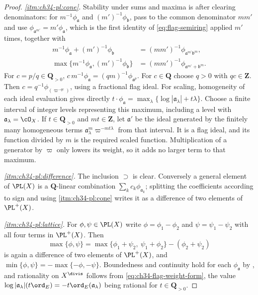\begin{proof}
\emph{\cref{itm:ch34-pl:cone}.}  Stability under sums and maxima is
 after clearing denominators: for
$m^{-1}\phi_{\mathfrak a}$ and $(m')^{-1}\phi_{\mathfrak b}$, pass to
the common denominator $mm'$ and use
$\phi_{\mathfrak a^{m'}}=m'\phi_{\mathfrak a}$, which is the first
identity of \eqref{eq:flag-semiring} applied $m'$ times, together with
\[
 \begin{aligned}
  m^{-1}\phi_{\mathfrak a}+(m')^{-1}\phi_{\mathfrak b}
   &=(mm')^{-1}\phi_{\mathfrak a^{m'}\mathfrak b^{m}},\\
  \max\{m^{-1}\phi_{\mathfrak a},(m')^{-1}\phi_{\mathfrak b}\}
   &=(mm')^{-1}\phi_{\mathfrak a^{m'}+\mathfrak b^{m}}.
 \end{aligned}
\]
For $c=p/q\in\mathbf Q_{>0}$, $c\,m^{-1}\phi_{\mathfrak a}
=(qm)^{-1}\phi_{\mathfrak a^{p}}$.  For $c\in\mathbf Q$ choose $q>0$ with $qc\in\mathbf Z$.
Then $c=q^{-1}\phi_{(\varpi^{-qc})}$, using a fractional flag ideal.
For scaling, homogeneity of each ideal evaluation gives directly
$t\cdot\phi_{\mathfrak a}
=\max_\lambda\{\log|\mathfrak a_\lambda|+t\lambda\}$.
Choose a finite interval of integer levels representing this maximum,
including a level with $\mathfrak a_\lambda=\cO_X$.
If $t\in\mathbf Q_{>0}$ and $mt\in\mathbf Z$, let $\mathfrak a'$
be the ideal generated by the finitely many homogeneous terms
$\mathfrak a_\lambda^m\varpi^{-mt\lambda}$ from that interval.
It is a flag ideal, and its function divided by $m$ is the required
scaled function.  Multiplication of a generator by $\varpi$ only
lowers its weight, so it adds no larger term to that maximum.

\emph{\cref{itm:ch34-pl:difference}.}  The inclusion $\supset$ is clear.
Conversely a general element of $\PL(X)$ is a $\mathbf Q$-linear
combination $\sum_kc_k\phi_{\mathfrak a_k}$; splitting the coefficients
according to sign and using \cref{itm:ch34-pl:cone} writes it as a
difference of two elements of $\PL^+(X)$.

\emph{\cref{itm:ch34-pl:lattice}.}  For $\phi,\psi\in\PL(X)$ write
$\phi=\phi_1-\phi_2$ and $\psi=\psi_1-\psi_2$ with all four terms in
$\PL^+(X)$.  Then
\[
 \max\{\phi,\psi\}
 =\max\{\phi_1+\psi_2,\ \psi_1+\phi_2\}-(\phi_2+\psi_2)
\]
is again a difference of two elements of $\PL^+(X)$, and
$\min\{\phi,\psi\}=-\max\{-\phi,-\psi\}$.  Boundedness and continuity
hold for each $\phi_{\mathfrak a}$ by
, and rationality on $X^{\divis}$
follows from \eqref{eq:ch34-flag-weight-form}, the value
$\log|\mathfrak a_\lambda|(t\ord_E)=-t\ord_E(\mathfrak a_\lambda)$ being
rational for $t\in\mathbf Q_{>0}$.


\end{proof}
